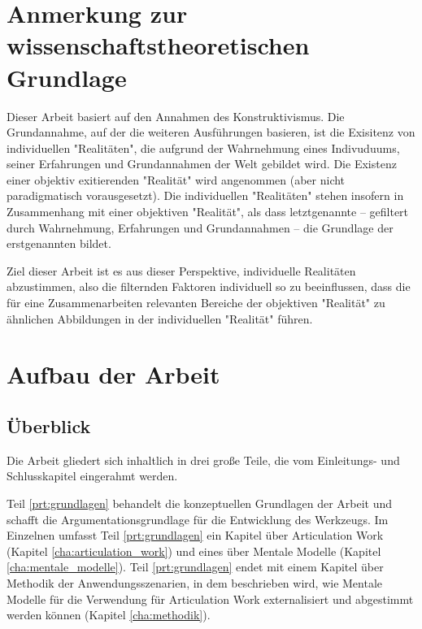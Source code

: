 
\section{Anmerkung zur wissenschaftstheoretischen Grundlage}

Dieser Arbeit basiert auf den Annahmen des Konstruktivismus. Die Grundannahme, auf der die weiteren Ausführungen basieren, ist die Exisitenz von individuellen "Realitäten", die aufgrund der Wahrnehmung eines Indivuduums, seiner Erfahrungen und Grundannahmen der Welt gebildet wird. Die Existenz einer objektiv exitierenden "Realität" wird angenommen (aber nicht paradigmatisch vorausgesetzt). Die individuellen "Realitäten" stehen insofern in Zusammenhang mit einer objektiven "Realität", als dass letztgenannte -- gefiltert durch Wahrnehmung, Erfahrungen und Grundannahmen -- die Grundlage der erstgenannten bildet.

Ziel dieser Arbeit ist es aus dieser Perspektive, individuelle Realitäten abzustimmen, also die filternden Faktoren individuell so zu beeinflussen, dass die für eine Zusammenarbeiten relevanten Bereiche der objektiven "Realität" zu ähnlichen Abbildungen in der individuellen "Realität" führen.

\section{Aufbau der Arbeit} %
\label{sec:aufbau_der_arbeit}

\subsection{Überblick} %
\label{sub:aufbau_ueberblick}

Die Arbeit gliedert sich inhaltlich in drei große Teile, die vom Einleitungs- und Schlusskapitel eingerahmt werden.

Teil \ref{prt:grundlagen} behandelt die konzeptuellen Grundlagen der Arbeit und schafft die Argumentationsgrundlage für die Entwicklung des Werkzeugs. Im Einzelnen umfasst Teil \ref{prt:grundlagen} ein Kapitel über Articulation Work (Kapitel \ref{cha:articulation_work}) und eines über Mentale Modelle (Kapitel \ref{cha:mentale_modelle}). Teil \ref{prt:grundlagen} endet mit einem Kapitel über Methodik der Anwendungsszenarien, in dem beschrieben wird, wie Mentale Modelle für die Verwendung für Articulation Work externalisiert und abgestimmt werden können (Kapitel \ref{cha:methodik}).

